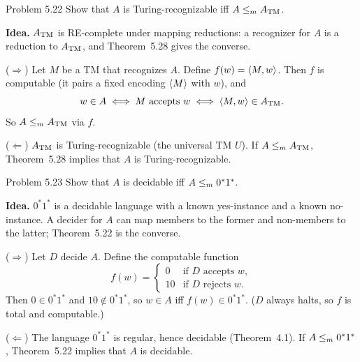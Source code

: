 \begin{question}{Problem 5.22}
Show that $A$ is Turing-recognizable iff $A\le_{m}A_{\mathrm{TM}}$.
\end{question}
\begin{soln}
\textbf{Idea.} $A_{\mathrm{TM}}$ is RE-complete under mapping reductions: a recognizer for $A$ is a reduction to $A_{\mathrm{TM}}$, and Theorem~5.28 gives the converse.

($\Rightarrow$) Let $M$ be a TM that recognizes $A$. Define $f(w)=\langle M,w\rangle$. Then $f$ is computable (it pairs a fixed encoding $\langle M\rangle$ with $w$), and
\[
w\in A \iff \text{$M$ accepts $w$} \iff \langle M,w\rangle\in A_{\mathrm{TM}}.
\]
So $A\le_{m}A_{\mathrm{TM}}$ via $f$.

($\Leftarrow$) $A_{\mathrm{TM}}$ is Turing-recognizable (the universal TM $U$). If $A\le_{m}A_{\mathrm{TM}}$, Theorem~5.28 implies that $A$ is Turing-recognizable.
\end{soln}

\begin{question}{Problem 5.23}
Show that $A$ is decidable iff $A\le_{m} 0^*1^*$.
\end{question}
\begin{soln}
\textbf{Idea.} $0^*1^*$ is a decidable language with a known yes-instance and a known no-instance. A decider for $A$ can map members to the former and non-members to the latter; Theorem~5.22 is the converse.

($\Rightarrow$) Let $D$ decide $A$. Define the computable function
\[
f(w)
=
\begin{cases}
0  & \text{if $D$ accepts $w$},\\
10 & \text{if $D$ rejects $w$}.
\end{cases}
\]
Then $0\in 0^*1^*$ and $10\notin 0^*1^*$, so $w\in A$ iff $f(w)\in 0^*1^*$. ($D$ always halts, so $f$ is total and computable.)

($\Leftarrow$) The language $0^*1^*$ is regular, hence decidable (Theorem~4.1). If $A\le_{m} 0^*1^*$, Theorem~5.22 implies that $A$ is decidable.
\end{soln}

